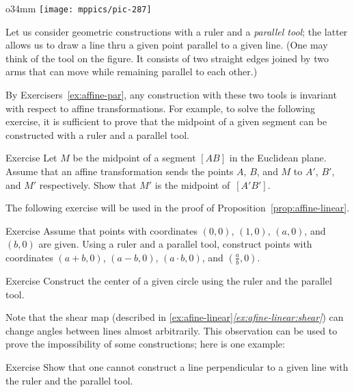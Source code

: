 \begin{wrapfigure}{o}{34mm}
\vskip-15mm
\centering
\texttt{[image: mppics/pic-287]}
\end{wrapfigure}

Let us consider geometric constructions with a ruler and a \emph{parallel tool};
the latter allows us to draw a line thru a given point parallel to a given line.
(One may think of the tool on the figure.
It consists of two straight edges joined by two arms that can move while remaining parallel to each other.)

By Exercisers~\ref{ex:affine-par}, any construction with these two tools is invariant with respect to affine transformations.
For example, 
to solve the following exercise,
it is sufficient to prove that the midpoint of a given segment can be constructed with a ruler and a parallel tool.

\begin{thm}{Exercise}\label{ex:midpoint-affine}
Let $M$ be the  midpoint of a segment $[AB]$ in the Euclidean plane.
Assume that an affine transformation sends the points $A$, $B$, and $M$
to $A'$, $B'$, and $M'$ respectively.
Show that $M'$ is the midpoint of~$[A'B']$.
\end{thm}

The following exercise will be used in the proof of Proposition~\ref{prop:affine-linear}.

\begin{thm}{Exercise}\label{ex:R-hom}
Assume that points with coordinates $(0,0)$, $(1,0)$, $(a,0)$, and $(b,0)$ are given.
Using a ruler and a parallel tool, construct points with coordinates $(a+b,0)$, $(a-b,0)$, $(a\cdot b,0)$, and $(\tfrac a b,0)$.
\end{thm}

\begin{thm}{Exercise}\label{ex:center-circ-affine}
Construct the center of a given circle using the ruler and the parallel tool.
\end{thm}

Note that the shear map (described in \ref{ex:afine-linear}\textit{\ref{ex:afine-linear:shear}}) can change angles between lines almost arbitrarily.
This observation can be used to prove the impossibility of some constructions;
here is one example:

\begin{thm}{Exercise}\label{ex:affine-perp}
Show that one cannot construct a line perpendicular to a given line with the ruler and the parallel tool.
\end{thm}

